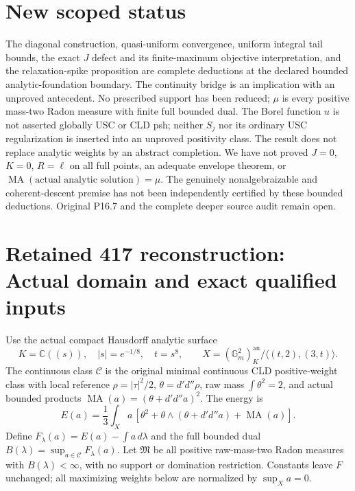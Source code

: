 \documentclass[11pt]{article}
\newcommand{\MA}{\operatorname{MA}}
\newcommand{\C}{\mathcal C}
\newcommand{\B}{\mathcal B}
\newcommand{\M}{\mathfrak M}
\begin{document}
\section{New scoped status}
The diagonal construction, quasi-uniform convergence, uniform integral
tail bounds, the exact $J$ defect and its finite-maximum objective
interpretation, and the relaxation-spike proposition are complete
deductions at the declared bounded analytic-foundation boundary.
The continuity bridge is an implication with an unproved antecedent.
No prescribed support has been reduced; $\mu$ is every positive
mass-two Radon measure with finite full bounded dual.
The Borel function $u$ is not asserted globally USC or CLD psh;
neither $S_j$ nor its ordinary USC regularization is inserted into an
unproved positivity class. The result does not replace analytic
weights by an abstract completion. We have not proved $J=0$, $K=0$,
$R=\ell$ on all full points, an adequate envelope theorem, or
$\MA(\text{actual analytic solution})=\mu$.
The genuinely nonalgebraizable and coherent-descent premise has not
been independently certified by these bounded deductions.
Original P16.7 and the complete deeper source audit remain open.


\begingroup
\renewcommand{\B}{\mathcal B}
\section{Retained 417 reconstruction: Actual domain and exact qualified inputs}
Use the actual compact Hausdorff analytic surface
\[
 K=\mathbb C((s)),\quad |s|=e^{-1/8},\quad t=s^8,\qquad
 X=(\mathbb G_m^2)^{\mathrm{an}}_K/\langle(t,2),(3,t)\rangle.
\]
The continuous class $\C$ is the original minimal continuous CLD
positive-weight class with local reference $\rho=|\tau|^2/2$,
$\theta=d'd''\rho$, raw mass $\int\theta^2=2$, and actual bounded
products $\MA(a)=(\theta+d'd''a)^2$. The energy is
\[
 E(a)=\frac13\int_Xa\,[\theta^2+
       \theta\wedge(\theta+d'd''a)+\MA(a)].
\]
Define $F_\lambda(a)=E(a)-\int a\,d\lambda$ and the full bounded
dual $B(\lambda)=\sup_{a\in\C}F_\lambda(a)$. Let $\M$ be all
positive raw-mass-two Radon measures with $B(\lambda)<\infty$,
with no support or domination restriction. Constants leave $F$ unchanged;
all maximizing weights below are normalized by $\sup_Xa=0$.
\end{document}
